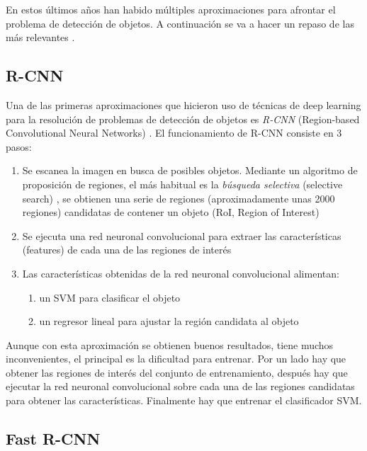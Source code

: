 En estos últimos años han habido múltiples aproximaciones para afrontar el problema de detección de objetos. A continuación se va a hacer un repaso de las más relevantes \cite{s2_stateofart1} \cite{s2_stateofart2} \cite{s2_stateofart5} \cite{s2_stateofart6} \cite{s2_stateofart7}.

\subsection*{R-CNN}

Una de las primeras aproximaciones que hicieron uso de técnicas de deep learning para la resolución de problemas de detección de objetos es \textit{R-CNN} (Region-based Convolutional Neural Networks) \cite{s2_stateofart_rcnn}. El funcionamiento de R-CNN consiste en 3 pasos:

\begin{enumerate}
	\item Se escanea la imagen en busca de posibles objetos. Mediante un algoritmo de proposición de regiones, el más habitual es la \textit{búsqueda selectiva} (selective search) \cite{s2_stateofart_selectivesearch}, se obtienen una serie de regiones (aproximadamente unas 2000 regiones) candidatas de contener un objeto (RoI, Region of Interest)
	\item Se ejecuta una red neuronal convolucional para extraer las características (features) de cada una de las regiones de interés
	\item Las características obtenidas de la red neuronal convolucional alimentan:
	\begin{enumerate}
		\item un SVM para clasificar el objeto
		\item un regresor lineal para ajustar la región candidata al objeto
	\end{enumerate}
\end{enumerate}

Aunque con esta aproximación se obtienen buenos resultados, tiene muchos inconvenientes, el principal es la dificultad para entrenar. Por un lado hay que obtener las regiones de interés del conjunto de entrenamiento, después hay que ejecutar la red neuronal convolucional sobre cada una de las regiones candidatas para obtener las características. Finalmente hay que entrenar el clasificador SVM.

\subsection*{Fast R-CNN}

